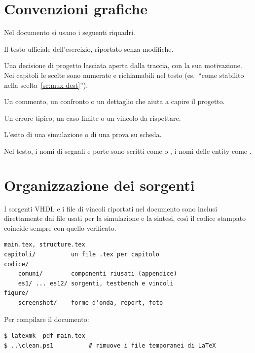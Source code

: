 \section*{Convenzioni grafiche}

Nel documento si usano i seguenti riquadri.

\begin{traccia}
	Il testo ufficiale dell'esercizio, riportato senza modifiche.
\end{traccia}

\begin{scelta*}[Titolo]
	Una decisione di progetto lasciata aperta dalla traccia, con la sua motivazione.
	Nei capitoli le scelte sono numerate e richiamabili nel testo
	(es.\ ``come stabilito nella scelta~\ref{sc:mux-dest}'').
\end{scelta*}

\begin{osservazione}
	Un commento, un confronto o un dettaglio che aiuta a capire il progetto.
\end{osservazione}

\begin{attenzione}
	Un errore tipico, un caso limite o un vincolo da rispettare.
\end{attenzione}

\begin{risultato}
	L'esito di una simulazione o di una prova su scheda.
\end{risultato}

Nel testo, i nomi di segnali e porte sono scritti come  o ,
i nomi delle entity come .

\section*{Organizzazione dei sorgenti}

I sorgenti VHDL e i file di vincoli riportati nel documento sono inclusi direttamente dai
file usati per la simulazione e la sintesi, così il codice stampato coincide sempre con quello verificato.

\begin{file}[elaborato/]
\begin{verbatim}
main.tex, structure.tex
capitoli/          un file .tex per capitolo
codice/
    comuni/        componenti riusati (appendice)
    es1/ ... es12/ sorgenti, testbench e vincoli
figure/
    screenshot/    forme d'onda, report, foto
\end{verbatim}
\end{file}

Per compilare il documento:

\begin{commandline}
\begin{verbatim}
$ latexmk -pdf main.tex
$ ..\clean.ps1          # rimuove i file temporanei di LaTeX
\end{verbatim}
\end{commandline}

